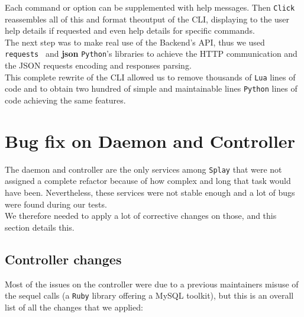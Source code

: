 \documentclass{eplmastersthesis}
\begin{document}
        Each command or option can be supplemented with help messages. Then
        \texttt{Click} reassembles all of this and format theoutput of the CLI,
        displaying to the user help details if requested and even help details
        for specific commands.\\

        The next step was to make real use of the Backend's API, thus we used
        \texttt{requests}~\cite{requests} and \textbf{json} \texttt{Python}'s libraries to
        achieve the HTTP communication and the JSON requests encoding and
        responses parsing.\\

        This complete rewrite of the CLI allowed us to remove thousands of
        \texttt{Lua} lines of code and to obtain two hundred of simple and
        maintainable lines \texttt{Python} lines of code achieving the same features.

    \section{Bug fix on Daemon and Controller}

      The daemon and controller are the only services
      among \texttt{Splay} that were not assigned a complete refactor because of how
      complex and long that task would have been. Nevertheless, these services
      were not stable enough and a lot of bugs were found during our tests.\\
      We therefore needed to apply a lot of corrective changes on those, and
      this section details this.

      \subsection{Controller changes}

        Most of the issues on the controller were due to a previous
        maintainers misuse of the sequel calls (a \texttt{Ruby} library offering a MySQL
        toolkit), but this is an overall list of all the changes that we
        applied:
\end{document}
